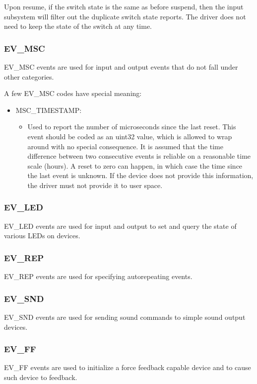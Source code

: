 \documentclass[a4paper,8pt,english]{sphinxmanual}
\begin{document}
Upon resume, if the switch state is the same as before suspend, then the input
subsystem will filter out the duplicate switch state reports. The driver does
not need to keep the state of the switch at any time.


\subsubsection{EV\_MSC}
\label{input/event-codes:ev-msc}
EV\_MSC events are used for input and output events that do not fall under other
categories.

A few EV\_MSC codes have special meaning:
\begin{itemize}
\item {} 
MSC\_TIMESTAMP:
\begin{itemize}
\item {} 
Used to report the number of microseconds since the last reset. This event
should be coded as an uint32 value, which is allowed to wrap around with
no special consequence. It is assumed that the time difference between two
consecutive events is reliable on a reasonable time scale (hours).
A reset to zero can happen, in which case the time since the last event is
unknown.  If the device does not provide this information, the driver must
not provide it to user space.

\end{itemize}

\end{itemize}


\subsubsection{EV\_LED}
\label{input/event-codes:ev-led}
EV\_LED events are used for input and output to set and query the state of
various LEDs on devices.


\subsubsection{EV\_REP}
\label{input/event-codes:ev-rep}
EV\_REP events are used for specifying autorepeating events.


\subsubsection{EV\_SND}
\label{input/event-codes:ev-snd}
EV\_SND events are used for sending sound commands to simple sound output
devices.


\subsubsection{EV\_FF}
\label{input/event-codes:ev-ff}
EV\_FF events are used to initialize a force feedback capable device and to cause
such device to feedback.
\end{document}
